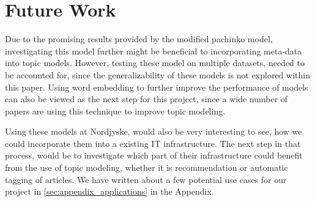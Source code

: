 \section{Future Work}\label{sec:future_work}
Due to the promising results provided by the modified pachinko model, investigating this model further might be beneficial to incorporating meta-data into topic models.
However, testing these model on multiple datasets, needed to be accounted for, since the generalizability of these models is not explored within this paper.
Using word embedding to further improve the performance of models can also be viewed as the next step for this project, since a wide number of papers are using this technique to improve topic modeling.


Using these models at Nordjyske, would also be very interesting to see, how we could incorporate them into a existing IT infrastructure.
The next step in that process, would be to investigate which part of their infrastructure could benefit from the use of topic modeling, whether it is recommendation or automatic tagging of articles. 
We have written about a few potential use cases for our project in \ref{sec:appendix_applications} in the Appendix. 
